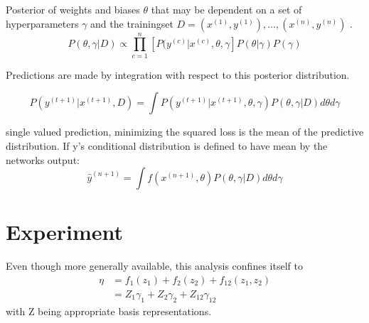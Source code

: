 \documentclass[11pt]{article}
\begin{document}

        Posterior of weights and biases $\theta$ that may be dependent on a set of hyperparameters $\gamma$ and the trainingset $D= (x^{(1)},y^{(1)}), \dots, (x^{(n)}, y^{(n)})$ .
         \begin{equation} \label{BNNPosterior1}
            P(\theta, \gamma| D) \propto \prod_{c=1}^n\left[P(y^{(c)}|x^{(c)}, \theta, \gamma \right] P(\theta|\gamma)P(\gamma)
        \end{equation}

        Predictions are made by integration with respect to this posterior distribution.

        \begin{equation}\label{BNNPosteriorPredictive1}
            P(y^{(t+1)}| x^{(t+1)}, D) = \int P(y^{(t+1)}| x^{(t+1)},\theta, \gamma) P (\theta , \gamma| D) d\theta d\gamma
        \end{equation}

        single valued prediction, minimizing the squared loss is the mean of the predictive distribution. If y's conditional distribution is defined to have mean by the networks output:
        \begin{equation}\label{predictiveSingleValueSQLoss1}
            \hat{y}^{(n+1)} = \int f(x^{(n+1)}, \theta) P(\theta, \gamma| D) d\theta d\gamma
        \end{equation}



    \clearpage
    \section{Experiment}
        Even though more generally available, this analysis confines itself to
        \begin{align}
            \eta &= f_1(z_1) + f_2(z_2) + f_{12}(z_1 , z_2) \\
                 &= Z_1 \gamma_1 + Z_2 \gamma_2 + Z_{12} \gamma_{12}
        \end{align}
        with Z being appropriate basis representations.
\end{document}
